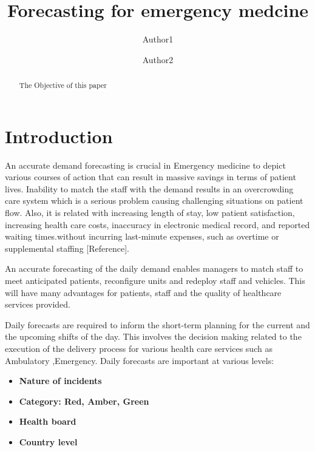 \documentclass[]{elsarticle} %
\begin{document}
\begin{frontmatter}

  \title{Forecasting for emergency medcine}
    \author[University1]{Author1}
    \author[University2]{Author2}
      \address[University1]{adress1}
    \address[University2]{adress2}
  
  \begin{abstract}
  The Objective of this paper
  \end{abstract}
  
 \end{frontmatter}

\hypertarget{introduction}{%
\section{Introduction}\label{introduction}}

An accurate demand forecasting is crucial in Emergency medicine to depict various courses of action that can result in massive savings in terms of patient lives. Inability to match the staff with the demand results in an overcrowding care system which is a serious problem causing challenging situations on patient flow. Also, it is related with increasing length of stay, low patient satisfaction, increasing health care costs, inaccuracy in electronic medical record, and reported waiting times.without incurring last-minute expenses, such as overtime or supplemental staffing {[}Reference{]}.

An accurate forecasting of the daily demand enables managers to match staff to meet anticipated patients, reconfigure units and redeploy staff and vehicles. This will have many advantages for patients, staff and the quality of healthcare services provided.

Daily forecasts are required to inform the short-term planning for the current and the upcoming shifts of the day. This involves the decision making related to the execution of the delivery process for various health care services such as Ambulatory ,Emergency. Daily forecasts are important at various levels:

\begin{itemize}
\item
  \textbf{Nature of incidents}
\item
  \textbf{Category: Red, Amber, Green}
\item
  \textbf{Health board}
\item
  \textbf{Country level}
\end{itemize}
\end{document}
